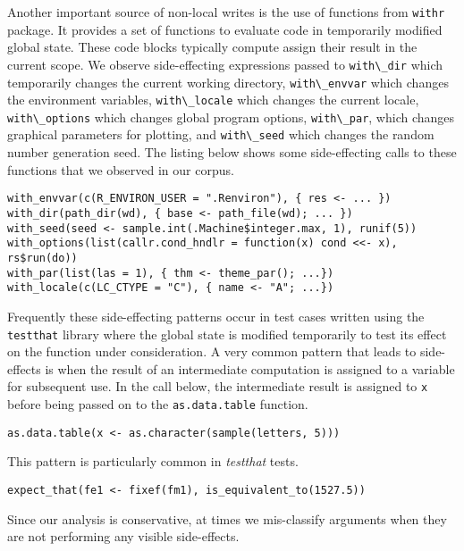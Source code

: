 \documentclass[review,nonacm,screen,acmsmall,anonymous=true]{acmart}
\newcommand{\code}[1]{\lstinline |#1|\xspace}
\begin{document}
Another important source of non-local writes is the use of functions from
\code{withr} package. It provides a set of functions to evaluate code in
temporarily modified global state. These code blocks typically compute
assign their result in the current scope. We observe
side-effecting expressions passed to \code{with\_dir} which temporarily changes
the current working directory, \code{with\_envvar} which changes the environment
variables, \code{with\_locale} which changes the current locale,
\code{with\_options} which changes global program options, \code{with\_par},
which changes graphical parameters for plotting, and \code{with\_seed} which
changes the random number generation seed. The listing below shows some
side-effecting calls to these functions that we observed in our corpus.
%
\begin{lstlisting}
with_envvar(c(R_ENVIRON_USER = ".Renviron"), { res <- ... })
with_dir(path_dir(wd), { base <- path_file(wd); ... })
with_seed(seed <- sample.int(.Machine$integer.max, 1), runif(5))
with_options(list(callr.cond_hndlr = function(x) cond <<- x), rs$run(do))
with_par(list(las = 1), { thm <- theme_par(); ...})
with_locale(c(LC_CTYPE = "C"), { name <- "A"; ...})
\end{lstlisting}
%
Frequently these side-effecting patterns occur in test cases written using the
\code{testthat} library where the global state is modified temporarily to test
its effect on the function under consideration.
%
A very common pattern that leads to side-effects is when the result of an
intermediate computation is assigned to a variable for subsequent use. In the
call below, the intermediate result is assigned to \code{x} before being passed
on to the \code{as.data.table} function.
%
\begin{lstlisting}
as.data.table(x <- as.character(sample(letters, 5)))
\end{lstlisting}
%
This pattern is particularly common in \emph{testthat} tests.
%
\begin{lstlisting}
expect_that(fe1 <- fixef(fm1), is_equivalent_to(1527.5))
\end{lstlisting}
%
Since our analysis is conservative, at times we mis-classify arguments when they
are not performing any visible side-effects.
\end{document}
